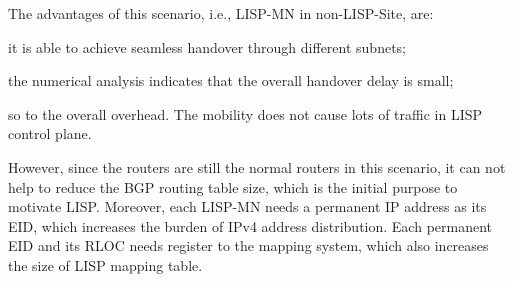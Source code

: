 {The advantages of this scenario, i.e., LISP-MN in non-LISP-Site, are: 
\begin{inparaenum}[1)]
	\item it is able to achieve seamless handover through different subnets;
	\item the numerical analysis indicates that the overall handover delay is small;
	\item so to the overall overhead. The mobility does not cause lots of traffic in LISP control plane.
\end{inparaenum}
However, since the routers are still the normal routers in this scenario, it can not help to reduce the BGP routing table size, which is the initial purpose to motivate LISP. Moreover, each LISP-MN needs a permanent IP address as its EID, which increases the burden of IPv4 address distribution. Each permanent EID and its RLOC needs register to the mapping system, which also increases the size of LISP mapping table.

}
